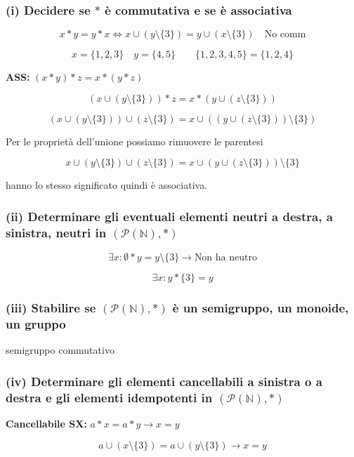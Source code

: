 \subsubsection*{(i) Decidere se $*$ è commutativa e se è associativa}

$$x * y = y * x \Leftrightarrow x \cup (y \setminus \{3\}) = y \cup (x \setminus \{3\}) \quad \text{No comm}$$

$$x = \{1, 2, 3\} \quad y = \{4, 5\} \qquad \{1, 2, 3, 4, 5\} = \{1, 2, 4\}$$

\textbf{ASS:} $(x * y) * z = x * (y * z)$

$$(x \cup (y \setminus \{3\})) * z = x * (y \cup (z \setminus \{3\}))$$

$$(x \cup (y \setminus \{3\})) \cup (z \setminus \{3\}) = x \cup ((y \cup (z \setminus \{3\})) \setminus \{3\})$$

Per le proprietà dell'unione possiamo rimuovere le parentesi

$$x \cup (y \setminus \{3\}) \cup (z \setminus \{3\}) = x \cup (y \cup (z \setminus \{3\})) \setminus \{3\}$$

hanno lo stesso significato quindi è associativa.

\subsubsection*{(ii) Determinare gli eventuali elementi neutri a destra, a sinistra, neutri in $(\mathcal{P}(\mathbb{N}), *)$}

$$\exists x : \emptyset * y = y \setminus \{3\} \longrightarrow \text{Non ha neutro}$$

$$\exists x : y * \{3\} = y$$

\subsubsection*{(iii) Stabilire se $(\mathcal{P}(\mathbb{N}), *)$ è un semigruppo, un monoide, un gruppo}

semigruppo commutativo

\subsubsection*{(iv) Determinare gli elementi cancellabili a sinistra o a destra e gli elementi idempotenti in $(\mathcal{P}(\mathbb{N}), *)$}

\textbf{Cancellabile SX:} $a * x = a * y \to x = y$

$$a \cup (x \setminus \{3\}) = a \cup (y \setminus \{3\}) \to x = y$$

